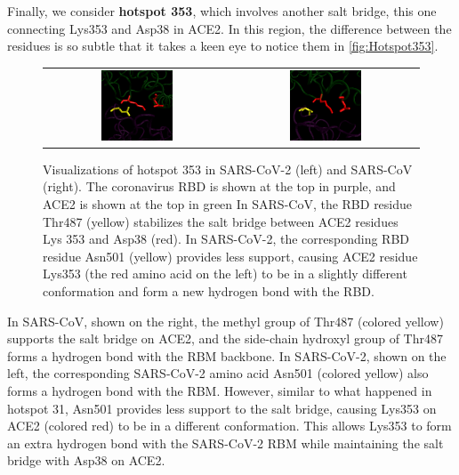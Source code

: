 Finally, we consider \textbf{hotspot 353}, which involves another salt bridge, this one connecting Lys353 and Asp38 in ACE2. In this region, the difference between the residues is so subtle that it takes a keen eye to notice them in \autoref{fig:Hotspot353}.\\

\begin{figure}[h]
	\centering
	\mySfFamily
	\begin{tabular}{c c}
	\includegraphics[width = 0.4\textwidth]{../images/Hotspot353_SARS-2.png} & \includegraphics[width = 0.4\textwidth]{../images/Hotspot353_SARS.png}
	\end{tabular}
	\caption{Visualizations of hotspot 353 in SARS-CoV-2 (left) and SARS-CoV (right). The coronavirus RBD is shown at the top in purple, and ACE2 is shown at the top in green In SARS-CoV, the RBD residue Thr487 (yellow) stabilizes the salt bridge between ACE2 residues Lys 353 and Asp38 (red). In SARS-CoV-2, the corresponding RBD residue Asn501 (yellow) provides less support, causing ACE2 residue Lys353 (the red amino acid on the left) to be in a slightly different conformation and form a new hydrogen bond with the RBD.}
	\label{fig:Hotspot353}
\end{figure}

In SARS-CoV, shown on the right, the methyl group of Thr487 (colored yellow) supports the salt bridge on ACE2, and the side-chain hydroxyl group of Thr487 forms a hydrogen bond with the RBM backbone. In SARS-CoV-2, shown on the left, the corresponding SARS-CoV-2 amino acid Asn501 (colored yellow) also forms a hydrogen bond with the RBM. However, similar to what happened in hotspot 31, Asn501 provides less support to the salt bridge, causing Lys353 on ACE2 (colored red) to be in a different conformation. This allows Lys353 to form an extra hydrogen bond with the SARS-CoV-2 RBM while maintaining the salt bridge with Asp38 on ACE2.

